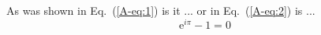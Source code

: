 \documentclass{scrbook}
\begin{document}
  As was shown in Eq.~(\ref{A-eq:1}) is it
  ... or in Eq.~(\ref{A-eq:2}) is ...
  \begin{equation}
    \mathrm{e}^{i\pi}-1=0 \label{eq:x}
  \end{equation}
\end{document}

